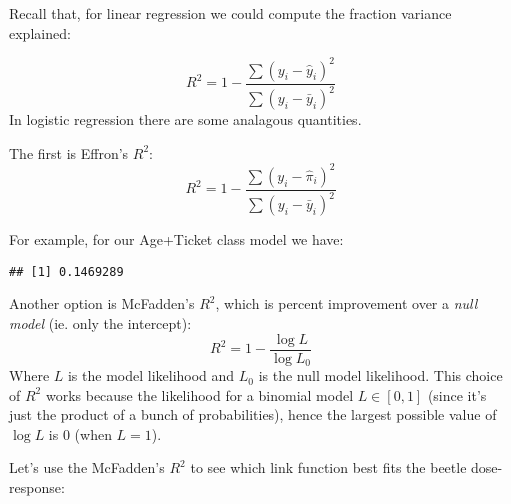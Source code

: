 \documentclass[
]{article}
\newenvironment{Shaded}{\begin{snugshade}}{\end{snugshade}}
\newcommand{\AttributeTok}[1]{\textcolor[rgb]{0.77,0.63,0.00}{#1}}
\newcommand{\DecValTok}[1]{\textcolor[rgb]{0.00,0.00,0.81}{#1}}
\newcommand{\FunctionTok}[1]{\textcolor[rgb]{0.00,0.00,0.00}{#1}}
\newcommand{\NormalTok}[1]{#1}
\newcommand{\OtherTok}[1]{\textcolor[rgb]{0.56,0.35,0.01}{#1}}
\newcommand{\SpecialCharTok}[1]{\textcolor[rgb]{0.00,0.00,0.00}{#1}}
\newcommand{\StringTok}[1]{\textcolor[rgb]{0.31,0.60,0.02}{#1}}
\begin{document}
Recall that, for linear regression we could compute the fraction
variance explained:

\[
R^2 = 1 - \frac{\sum(y_i-\hat{y}_i)^2}{\sum(y_i-\bar{y}_i)^2}
\] In logistic regression there are some analagous quantities.

The first is Effron's \(R^2\): \[
R^2 = 1 - \frac{\sum(y_i-\hat{\pi}_i)^2}{\sum(y_i-\bar{y}_i)^2}
\]

For example, for our Age+Ticket class model we have:

\begin{Shaded}
\end{Shaded}

\begin{verbatim}
## [1] 0.1469289
\end{verbatim}

Another option is McFadden's \(R^2\), which is percent improvement over
a \emph{null model} (ie. only the intercept): \[
R^2 = 1 - \frac{\log L}{\log L_0}
\] Where \(L\) is the model likelihood and \(L_0\) is the null model
likelihood. This choice of \(R^2\) works because the likelihood for a
binomial model \(L \in [0,1]\) (since it's just the product of a bunch
of probabilities), hence the largest possible value of \(\log L\) is
\(0\) (when \(L=1\)).

Let's use the McFadden's \(R^2\) to see which link function best fits
the beetle dose-response:
\end{document}
